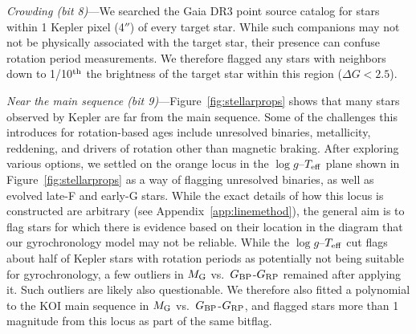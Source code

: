 \documentclass[11pt,twocolumn,tighten,linenumbers,trackchanges]{aastex63}
\begin{document}
{\it Crowding (bit 8)}---We searched the Gaia DR3 point source catalog
for stars within 1 Kepler pixel (4$''$) of every target star.  While
such companions may not not be physically associated with the target
star, their presence can confuse rotation period measurements.  We
therefore flagged any stars with neighbors down to 1/10$^{\rm th}$ the
brightness of the target star within this region ($\Delta G < 2.5$).

{\it Near the main sequence (bit 9)}---Figure~\ref{fig:stellarprops} shows
that many stars observed by Kepler
are far from the main sequence.  Some of the challenges this introduces
for rotation-based ages include unresolved binaries, metallicity,
reddening, and drivers of rotation other than magnetic braking.
After exploring various options, we settled on the orange locus in the
$\log g$--$T_{\rm eff}$ plane shown in Figure~\ref{fig:stellarprops}
as a way of flagging unresolved binaries, as well as evolved
late-F and early-G stars.  While the exact details of how this locus
is constructed are arbitrary (see Appendix~\ref{app:linemethod}), the
general aim is to flag stars for which there is evidence based on
their location in the  diagram that our gyrochronology model may not
be reliable.  While the $\log g$--$T_{\rm eff}$ cut flags about half
of Kepler stars with rotation periods as potentially not being
suitable for gyrochronology, a few outliers in $M_{\rm G}$ vs.~$G_{\rm
BP}$-$G_{\rm RP}$ remained after applying it.  Such outliers are
likely also questionable.  We therefore also fitted a polynomial to
the KOI main sequence in $M_{\rm G}$ vs.~$G_{\rm
	BP}$-$G_{\rm RP}$, and flagged stars more than 1\,magnitude from
this locus as part of the same bitflag.

\end{document}

